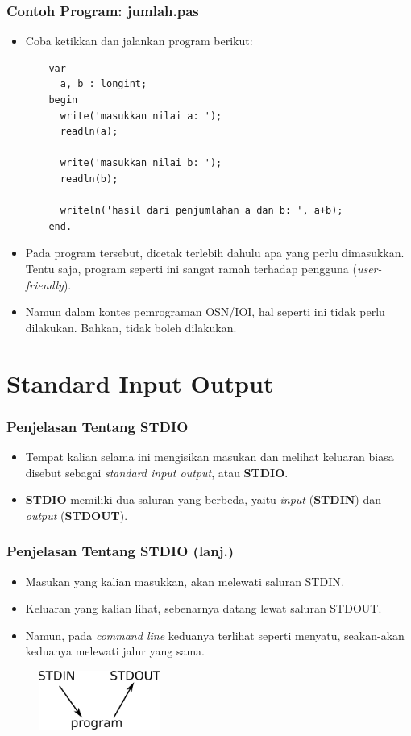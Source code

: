 \documentclass{beamer}
\begin{document}
\begin{frame}[fragile]
\frametitle{Contoh Program: jumlah.pas}
\begin{itemize}
  \item Coba ketikkan dan jalankan program berikut:
  \begin{lstlisting}
    var
      a, b : longint;
    begin
      write('masukkan nilai a: ');
      readln(a);

      write('masukkan nilai b: ');
      readln(b);

      writeln('hasil dari penjumlahan a dan b: ', a+b);
    end.
  \end{lstlisting}
  \item Pada program tersebut, dicetak terlebih dahulu apa yang perlu dimasukkan. Tentu saja, program seperti ini sangat ramah terhadap pengguna (\textit{user-friendly}).
  \item Namun dalam kontes pemrograman OSN/IOI, hal seperti \newline ini tidak perlu dilakukan. Bahkan, tidak boleh dilakukan.
\end{itemize}
\end{frame}

\section{Standard Input Output}
\frame{\sectionpage}

\begin{frame}
\frametitle{Penjelasan Tentang STDIO}
\begin{itemize}
  \item Tempat kalian selama ini mengisikan masukan dan melihat keluaran biasa disebut sebagai \textit{standard input output}, atau \textbf{STDIO}.
  \item \textbf{STDIO} memiliki dua saluran yang berbeda, yaitu \textit{input} (\textbf{STDIN}) dan \textit{output} (\textbf{STDOUT}).
\end{itemize}
\end{frame}

\begin{frame}
\frametitle{Penjelasan Tentang STDIO (lanj.)}
\begin{itemize}
  \item Masukan yang kalian masukkan, akan melewati saluran STDIN.
  \item Keluaran yang kalian lihat, sebenarnya datang lewat saluran STDOUT.
  \item Namun, pada \textit{command line} keduanya terlihat seperti menyatu, seakan-akan keduanya melewati jalur yang sama.
\end{itemize}
\begin{figure}
  \includegraphics[width=4cm]{asset/g1.png}
\end{figure}
\end{frame}
\end{document}
